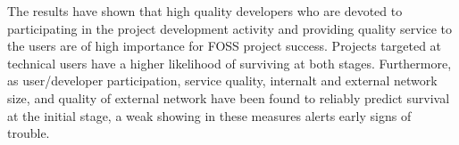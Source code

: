 \begin{thebibliography}{99}
		The results have shown that high quality developers who are devoted to
		participating in the project development activity and providing quality
		service to the users are of high importance for FOSS project success. Projects
		targeted at technical users have a higher likelihood of surviving at both
		stages. Furthermore, as user/developer participation, service quality,
		internalt and external network size, and quality of external network have been
		found to reliably predict survival at the initial stage, a weak showing in
		these measures alerts early signs of trouble.
\end{thebibliography}
\endgroup
